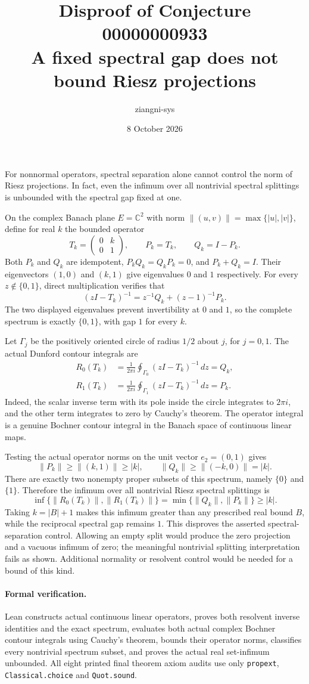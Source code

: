 \documentclass[11pt]{article}
\title{Disproof of Conjecture 00000000933\\A fixed spectral gap does not bound Riesz projections}
\author{ziangni-sys}
\date{8 October 2026}
\begin{document}
\maketitle
For nonnormal operators, spectral separation alone cannot control the norm of Riesz projections. In fact, even the infimum over all nontrivial spectral splittings is unbounded with the spectral gap fixed at one.

On the complex Banach plane $E=\mathbb C^2$ with norm $\|(u,v)\|=\max\{|u|,|v|\}$, define for real $k$ the bounded operator
\[
 T_k=\begin{pmatrix}0&k\\0&1\end{pmatrix},\qquad
 P_k=T_k,\qquad Q_k=I-P_k.
\]
Both $P_k$ and $Q_k$ are idempotent, $P_kQ_k=Q_kP_k=0$, and $P_k+Q_k=I$. Their eigenvectors $(1,0)$ and $(k,1)$ give eigenvalues $0$ and $1$ respectively. For every $z\notin\{0,1\}$, direct multiplication verifies that
\[
 (zI-T_k)^{-1}=z^{-1}Q_k+(z-1)^{-1}P_k.
\]
The two displayed eigenvalues prevent invertibility at $0$ and $1$, so the complete spectrum is exactly $\{0,1\}$, with gap $1$ for every $k$.

Let $\Gamma_j$ be the positively oriented circle of radius $1/2$ about $j$, for $j=0,1$. The actual Dunford contour integrals are
\begin{align*}
 R_0(T_k)&=\frac1{2\pi i}\oint_{\Gamma_0}(zI-T_k)^{-1}\,dz=Q_k,\\
 R_1(T_k)&=\frac1{2\pi i}\oint_{\Gamma_1}(zI-T_k)^{-1}\,dz=P_k.
\end{align*}
Indeed, the scalar inverse term with its pole inside the circle integrates to $2\pi i$, and the other term integrates to zero by Cauchy's theorem. The operator integral is a genuine Bochner contour integral in the Banach space of continuous linear maps.

Testing the actual operator norms on the unit vector $e_2=(0,1)$ gives
\[
 \|P_k\|\ge\|(k,1)\|\ge|k|,\qquad
 \|Q_k\|\ge\|(-k,0)\|=|k|.
\]
There are exactly two nonempty proper subsets of this spectrum, namely $\{0\}$ and $\{1\}$. Therefore the infimum over all nontrivial Riesz spectral splittings is
\[
 \inf\{\|R_0(T_k)\|,\|R_1(T_k)\|\}
 =\min\{\|Q_k\|,\|P_k\|\}\ge |k|.
\]
Taking $k=|B|+1$ makes this infimum greater than any prescribed real bound $B$, while the reciprocal spectral gap remains $1$. This disproves the asserted spectral-separation control. Allowing an empty split would produce the zero projection and a vacuous infimum of zero; the meaningful nontrivial splitting interpretation fails as shown. Additional normality or resolvent control would be needed for a bound of this kind.

\paragraph{Formal verification.}
Lean constructs actual continuous linear operators, proves both resolvent inverse identities and the exact spectrum, evaluates both actual complex Bochner contour integrals using Cauchy's theorem, bounds their operator norms, classifies every nontrivial spectrum subset, and proves the actual real set-infimum unbounded. All eight printed final theorem axiom audits use only \texttt{propext}, \texttt{Classical.choice} and \texttt{Quot.sound}.
\end{document}
